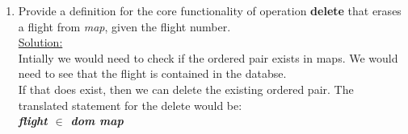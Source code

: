 \begin{enumerate}
  \item Provide a definition for the core functionality of operation \textbf{delete} that erases a flight from \emph{map}, given the flight number.\\
  \noindent\underline{Solution:}\\Intially we would need to check if the ordered pair exists in maps. We would need to see that the flight is contained in the databse.\\
  If that does exist, then we can delete the existing ordered pair. The translated statement for the delete would be:\\
  \textbf{\emph{flight $\in$ dom map}}\\

  
  


\end{enumerate}